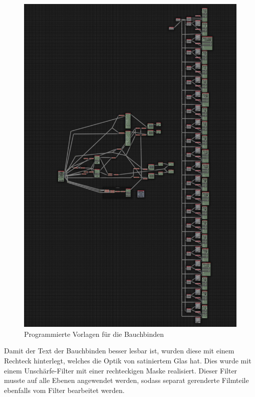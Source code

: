 \begin{figure}[H]
\begin{center}
\includegraphics[width=\textwidth]{gfx/post/call-out.jpg}
\caption{Programmierte Vorlagen für die Bauchbinden}
\label{out}
\end{center}
\end{figure}

Damit der Text der Bauchbinden besser lesbar ist, wurden diese mit einem Rechteck hinterlegt, welches die Optik von satiniertem Glas hat. Dies wurde mit einem Unschärfe-Filter mit einer rechteckigen Maske realisiert. Dieser Filter musste auf alle Ebenen angewendet werden, sodass separat gerenderte Filmteile ebenfalls vom Filter bearbeitet werden.

